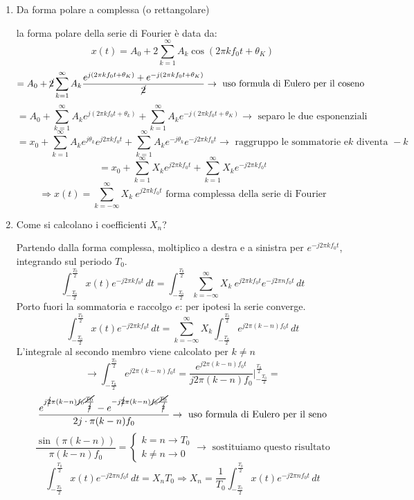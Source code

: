 \documentclass[
]{article}
\begin{document}
\begin{enumerate}
\def\labelenumi{\arabic{enumi}.}
\setcounter{enumi}{1}
\item
  Da forma polare a complessa (o rettangolare)

  la forma polare della serie di Fourier è data da: \[
   x(t) = A_0 + 2 \sum_{k=1}^{\infty} A_{k} \cos (2\pi kf_{0}t + \theta_{K})
   \] \[
   = A_0 + \cancel{2} \sum_{k=1}^{\infty} A_{k} \frac{e^{j(2\pi kf_{0}t + \theta_{K})}+e^{-j(2\pi kf_{0}t + \theta_{K})}}{\cancel{2}} \to \text{ uso formula di Eulero per il coseno}
   \] \[
   = A_0 + \sum_{k=1}^{\infty} A_{k} e^{j(2\pi kf_{0}t + \theta_{k})}  + \sum_{k=1}^{\infty} A_{k} e^{-j(2\pi kf_{0}t + \theta_{K})} \to \text{ separo le due esponenziali}
   \] \[
   = x_0 + \sum_{k=1}^{\infty} A_{k} e^{j\theta_{k}} e^{j2\pi kf_{0}t}  + \sum_{k=1}^{\infty} A_{k} e^{-j\theta_{k}} e^{-j2\pi kf_{0}t}  \to \text{ raggruppo le sommatorie e} k \text{ diventa }-k
   \] \[
   = x_0 + \sum_{k=1}^{\infty} X_k e^{j2\pi kf_{0}t}  + \sum_{k=1}^{\infty} X_k e^{-j2\pi kf_{0}t}
   \] \[
   \Rightarrow x(t) = \sum_{k=-\infty}^{\infty} X_k \ e^{j2\pi kf_{0}t} \text{ forma complessa della serie di Fourier}
   \]
\item
  Come si calcolano i coefficienti \(X_n\)?

  Partendo dalla forma complessa, moltiplico a destra e a sinistra per
  \(e^{-j2\pi kf_{0}t}\), integrando sul periodo \(T_0\). \[
   \int_{-\frac{T_0}{2}}^{\frac{T_0}{2}} x(t)e^{-j2\pi kf_{0}t} \,dt = \int_{-\frac{T_0}{2}}^{\frac{T_0}{2}} \sum_{k=-\infty}^{\infty} X_k \ e^{j2\pi kf_{0}t}  e^{-j2\pi nf_{0}t} \,dt
   \] Porto fuori la sommatoria e raccolgo \(e\): per ipotesi la serie
  converge. \[
   \int_{-\frac{T_0}{2}}^{\frac{T_0}{2}} x(t)e^{-j2\pi kf_{0}t} \,dt = \sum_{k=-\infty}^{\infty} X_k  \int_{-\frac{T_0}{2}}^{\frac{T_0}{2}} e^{j2\pi (k-n)f_{0}t} \,dt
   \] L'integrale al secondo membro viene calcolato per \(k\neq n\) \[
   \to \int_{-\frac{T_0}{2}}^{\frac{T_0}{2}} e^{j2\pi (k-n)f_{0}t} = \frac{e^{j2\pi (k-n)f_{0}t}}{j2\pi (k-n)f_{0}} \Big|_{-\frac{T_0}{2}}^{\frac{T_0}{2}}=
   \] \[
   \frac{e^{j\cancel{2}\pi (k-n)\cancel{f_{0}}\frac{\cancel{T_0}}{\cancel{2}}} - e^{-j\cancel{2}\pi (k-n)\cancel{f_{0}}\frac{\cancel{T_0}}{\cancel{2}}}}{2j \cdot \pi (k-n)f_{0}} \to \text{ uso formula di Eulero per il seno}
   \] \[
   \frac{\sin (\pi (k-n))}{\pi (k-n)f_{0}} = \left\{ \begin{array}{cl}
   k=n\to T_0  \\
   k\neq n \to 0
   \end{array} \right.
   \to \text{ sostituiamo questo risultato}
   \] \[
   \int_{-\frac{T_0}{2}}^{\frac{T_0}{2}} x(t)e^{-j2\pi nf_{0}t} \,dt = X_{n}T_{0} \Rightarrow X_{n} = \frac{1}{T_0}\int_{-\frac{T_0}{2}}^{\frac{T_0}{2}} x(t)e^{-j2\pi nf_{0}t} \,dt 
   \]


\end{enumerate}
\end{document}
